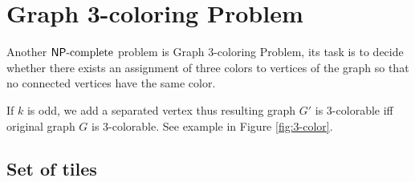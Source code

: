 \section{Graph 3-coloring Problem}




Another $\mathsf{NP}\textnormal{-complete}$ problem is Graph 3-coloring Problem, its task is to decide whether there exists an assignment of three colors to vertices of the graph so that no connected vertices have the same color.

If $k$ is odd, we add a separated vertex thus resulting graph $G'$ is 3-colorable iff original graph $G$ is 3-colorable. See example in Figure \ref{fig:3-color}.



\subsection*{Set of tiles}

